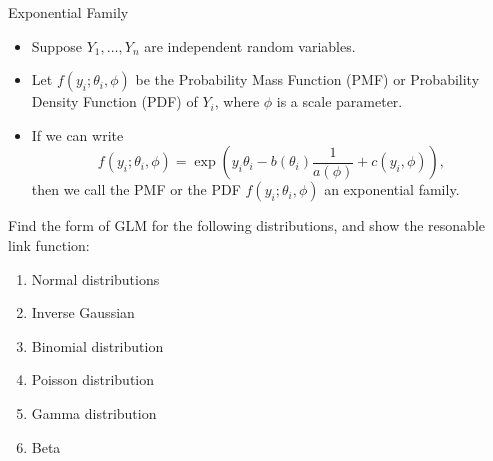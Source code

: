 \documentclass[UTF8,a4paper,10pt]{article}
\begin{document}
\begin{mybox}{Exponential Family}
  \begin{itemize}
      \item Suppose $Y_1, \ldots, Y_n$ are independent random variables.
      \item Let $f(y_i; \theta_i, \phi)$ be the Probability Mass Function (PMF) or Probability Density Function (PDF) of $Y_i$, where $\phi$ is a scale parameter.
      \item If we can write
      \[
      f(y_i; \theta_i, \phi) = \exp\left(y_i \theta_i - b(\theta_i) \frac{1}{a(\phi)} + c(y_i, \phi)\right),
      \]
      then we call the PMF or the PDF $f(y_i; \theta_i, \phi)$ an exponential family.
  \end{itemize}
  


\end{mybox}




  \begin{Problem}[]{}
    Find the form of GLM for the following distributions, and show the resonable link function:
    \begin{enumerate}
      \item Normal distributions
      \item Inverse Gaussian
      \item Binomial distribution
      \item Poisson distribution
      \item Gamma distribution
      \item Beta 
    \end{enumerate}
    
  \end{Problem}
\end{document}
